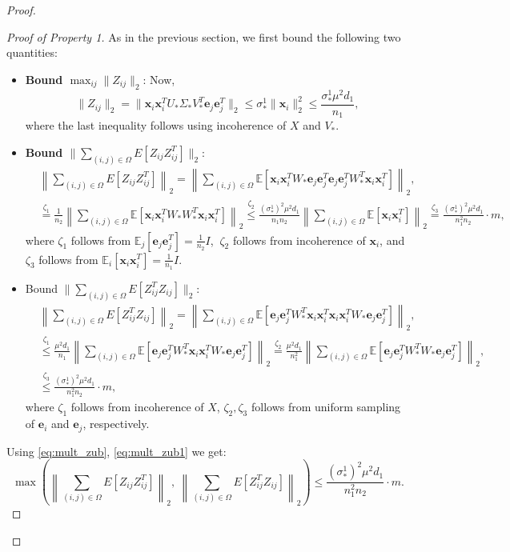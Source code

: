 \documentclass[11pt]{article}
\newcommand{\e}{\bm{e}}
\newcommand{\tp}[1]{{#1}^{T}}
\newcommand{\E}{\mathbb{E}}
\renewcommand{\v}{\bm{v}}
\newcommand{\Vo}{V_*}
\newcommand{\Vot}{\tp{V}_*}
\newcommand{\So}{\Sigma_*}
\newcommand{\Uo}{U_*}
\newcommand{\so}{\sigma_*}
\newcommand{\xti}{\tp{\x}_i}
\newcommand{\Wo}{W_*}
\newcommand{\Wot}{\tp{W}_*}
\newcommand{\x}{\bm{x}}
\newcommand{\etj}{\tp{\e}_j}
\newcommand{\ej}{\e_j}
\begin{document}
\begin{proof}
\begin{proof}[Proof of Property 1]
As in the previous section, we first bound the following two quantities:
\begin{itemize}
\item {\bf Bound $\max_{ij} \|Z_{ij}\|_2$}: Now, $$\|Z_{ij}\|_2=\|\x_i\xti \Uo\So\Vot \e_j\etj\|_2\leq \so^1 \|\x_i\|_2^2 \leq \frac{\so^1\mu^2d_1}{n_1},$$
where the last inequality follows using incoherence of $X$ and $\Vo$.  
\item {\bf Bound $\|\sum_{(i,j)\in \Omega}E[Z_{ij}Z_{ij}^T]\|_2$}: %
\begin{align}
&\left\|\sum_{(i,j)\in \Omega}E[Z_{ij}Z_{ij}^T]\right\|_2=\left\|\sum_{(i,j)\in \Omega}\E[\x_i\xti\Wo\ej\etj\ej\etj\Wo^T \x_i \xti]\right\|_2,\nonumber\\
&\stackrel{\zeta_1}{=} \frac{1}{n_2} \left\|\sum_{(i,j)\in \Omega}\E[\x_i\xti\Wo\Wo^T\x_i \xti]\right\|_2\stackrel{\zeta_2}{\leq} \frac{(\so^1)^2\mu^2d_1}{n_1n_2}\left\|\sum_{(i,j)\in \Omega}\E[\x_i \xti]\right\|_2\stackrel{\zeta_3}{=} \frac{(\so^1)^2\mu^2d_1}{n_1^2n_2}\cdot m,\label{eq:mult_zub}
\end{align}
where $\zeta_1$ follows from $\E_j[\e_j\etj]=\frac{1}{n_2}I$, $\ \zeta_2$ follows from incoherence of $\x_i$, and $\zeta_3$ follows from $\E_i[\x_i\xti]=\frac{1}{n_1}I$.
\item {Bound $\|\sum_{(i,j)\in \Omega}E[Z_{ij}^TZ_{ij}]\|_2$}: 
\begin{align}
&\left\|\sum_{(i,j)\in \Omega}E[Z_{ij}^TZ_{ij}]\right\|_2=\left\|\sum_{(i,j)\in \Omega}\E[\ej\etj\Wot\x_i\xti\x_i\xti\Wo\ej\etj]\right\|_2,\nonumber\\
&\stackrel{\zeta_1}{\leq } \frac{\mu^2d_1}{n_1} \left\|\sum_{(i,j)\in \Omega}\E[\ej\etj\Wot\x_i\xti\Wo\ej\etj]\right\|_2\stackrel{\zeta_2}{=} \frac{\mu^2d_1}{n_1^2}\left\|\sum_{(i,j)\in \Omega}\E[\ej\etj\Wot\Wo\ej\etj]\right\|_2,\nonumber\\
&\stackrel{\zeta_3}{\leq} \frac{(\so^1)^2\mu^2d_1}{n_1^2n_2}\cdot m,\label{eq:mult_zub1}
\end{align}
where $\zeta_1$ follows from incoherence of $X$, $\zeta_2, \zeta_3$ follows from uniform sampling of $\e_i$ and $\e_j$, respectively. 
\end{itemize}
Using  \eqref{eq:mult_zub}, \eqref{eq:mult_zub1} we get: $$\max\left(\left\|\sum_{(i,j)\in \Omega}E[Z_{ij}Z_{ij}^T]\right\|_2,\ \left\|\sum_{(i,j)\in \Omega}E[Z_{ij}^TZ_{ij}]\right\|_2\right)\leq \frac{(\so^1)^2\mu^2d_1}{n_1^2n_2}\cdot m.$$


\end{proof}
\end{proof}
\end{document}
